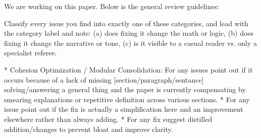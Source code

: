 We are working on this paper.  Below is the general review guidelines:

Classify every issue you find into exactly one of these categories, and lead with the category label and note: (a) does fixing it change the math or logic, (b) does fixing it change the narrative or tone, (c) is it visible to a casual reader vs. only a specialist referee.

* Cohesion Optimization / Modular Consolidation: For any issues point out if it occurs because of a lack of missing [section/paragraph/sentance] solving/answering a general thing and the paper is currently compensating by smearing explanations or repetitive definition across various sections.
* For any issue point out if the fix is actually a simplification here and an improvement elsewhere rather than always adding.
* For any fix suggest distilled addition/changes to prevent bloat and improve clarity.

